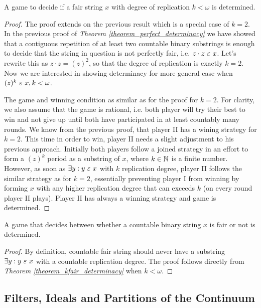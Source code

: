 \begin{theorem}\label{theorem_kfair_determinacy}
  A game to decide if a fair string $x$ with degree of replication $k < \omega$ is determined.
\end{theorem}
\begin{proof}
  The proof extends on the previous result which is a special case of $k = 2$. In the previous proof of \textit{Theorem \ref{theorem_perfect_determinacy}} we have showed that a contiguous repetition of at least two countable binary substrings is enough to decide that the string in question is not perfectly fair, i.e. $z \cdot z \ \varepsilon\  x$. Let's rewrite this as $z \cdot z = (z)^{2}$, so that the degree of replication is exactly $k = 2$. Now we are interested in showing determinacy for more general case when $(z)^{k} \ \varepsilon\  x, k < \omega$.

  The game and winning condition as similar as for the proof for $k = 2$. For clarity, we also assume that the game is rational, i.e. both player will try their best to win and not give up until both have participated in at least countably many rounds. We know from the previous proof, that player II has a wining strategy for $k=2$. This time in order to win, player II needs a slight adjustment to his previous approach. Initially both players follow a joined strategy in an effort to form a $(z)^{k}$ period as a substring of $x$, where $k \in \mathbb{N}$ is a finite number. However, as soon as $\exists y: y \ \varepsilon\  x$ with $k$ replication degree, player II follows the similar strategy as for $k=2$, essentially preventing player I from winning by forming $x$ with any higher replication degree that can exceeds $k$ (on every round player II plays). Player II has always a winning strategy and game is determined.
\end{proof}

\begin{corollary}\label{corollary_fair_determinacy}
  A game that decides between whether a countable binary string $x$ is fair or not is determined. 
\end{corollary}
\begin{proof}
  By definition, countable fair string should never have a substring $\exists y: y \ \varepsilon\  x$ with a countable replication degree. The proof follows directly from \textit{Theorem \ref{theorem_kfair_determinacy}} when $k < \omega$. 
\end{proof}



\subsection{Filters, Ideals and Partitions of the Continuum}\label{subsec_filters}

